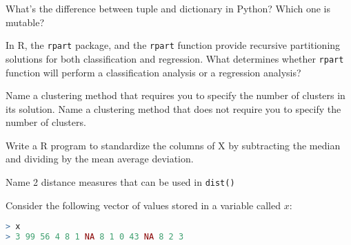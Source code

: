 \documentclass[12pt]{exam}
\begin{document}
\begin{questions}

\question[2] What's the difference between tuple and dictionary in Python? Which one is mutable?
\makeemptybox{1in}
\addpoints

\question[2] In R, the \texttt{rpart} package, and the \texttt{rpart} function provide recursive partitioning solutions for both classification and regression. What determines whether \texttt{rpart} function will perform a classification analysis or a regression analysis?
\makeemptybox{1in}
\addpoints

\question[2] Name a clustering method that requires you to specify the number of
clusters in its solution. Name a clustering method that does not require you to
specify the number of clusters.
\makeemptybox{1in}
\addpoints

\question[2] Write a R program to standardize the columns of X by subtracting the median and dividing by the mean average deviation.
\makeemptybox{1in}
\addpoints

\question[2] Name 2 distance measures that can be used in \texttt{dist()} 
\makeemptybox{1in}
\addpoints

\question[10] Consider the following vector of values stored in a variable called $x$: \\
\begin{lstlisting}[language=R]
> x
> 3 99 56 4 8 1 NA 8 1 0 43 NA 8 2 3 
\end{lstlisting}
\noaddpoints %
\end{questions}
\end{document}
